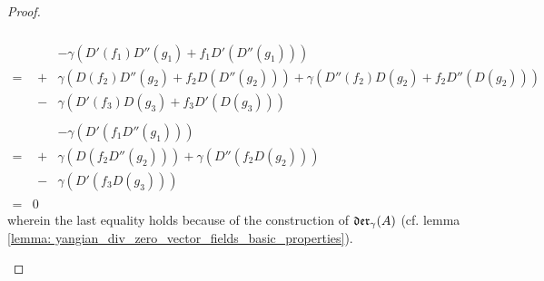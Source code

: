 \begin{proof}
\begin{enumerate}
$$\begin{aligned}
                                \\
                                = &
                                \begin{aligned}
                                    & -\gamma\left( D'(f_1) D''(g_1) + f_1 D' (D''(g_1)) \right)
                                    \\
                                    + & \gamma\left( D(f_2) D''(g_2) + f_2 D( D''(g_2) ) \right) + \gamma( D''(f_2) D(g_2) + f_2 D''( D(g_2) ) )
                                    \\
                                    - & \gamma\left( D'(f_3) D(g_3) + f_3 D'(D(g_3)) \right)
                                \end{aligned}
                                \\
                                = &
                                \begin{aligned}
                                    & -\gamma\left( D'( f_1 D''(g_1) ) \right)
                                    \\
                                    + & \gamma\left( D( f_2 D''(g_2) ) \right) + \gamma\left( D''( f_2 D(g_2) ) \right)
                                    \\
                                    - & \gamma\left( D'( f_3 D(g_3) ) \right)
                                \end{aligned}
                                \\
                                = & 0
                            \end{aligned}
                        $$
                    wherein the last equality holds because of the construction of $\mathfrak{der}_{\gamma}(A)$ (cf. lemma \ref{lemma: yangian_div_zero_vector_fields_basic_properties}).
                \end{enumerate}


\end{proof}
